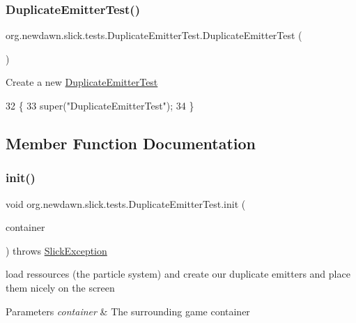 \subsubsection{\texorpdfstring{Duplicate\+Emitter\+Test()}{DuplicateEmitterTest()}}
{\footnotesize\ttfamily org.\+newdawn.\+slick.\+tests.\+Duplicate\+Emitter\+Test.\+Duplicate\+Emitter\+Test (\begin{DoxyParamCaption}{ }\end{DoxyParamCaption})\hspace{0.3cm}{\ttfamily [inline]}}

Create a new \mbox{\hyperlink{classorg_1_1newdawn_1_1slick_1_1tests_1_1_duplicate_emitter_test}{Duplicate\+Emitter\+Test}} 
\begin{DoxyCode}
32                                   \{
33         super(\textcolor{stringliteral}{"DuplicateEmitterTest"});
34     \}
\end{DoxyCode}


\subsection{Member Function Documentation}
\mbox{\label{classorg_1_1newdawn_1_1slick_1_1tests_1_1_duplicate_emitter_test_a82777b20d86f8acf92130dd142c750cd}} 
\subsubsection{\texorpdfstring{init()}{init()}}
{\footnotesize\ttfamily void org.\+newdawn.\+slick.\+tests.\+Duplicate\+Emitter\+Test.\+init (\begin{DoxyParamCaption}\item[{\mbox{\hyperlink{classorg_1_1newdawn_1_1slick_1_1_game_container}{Game\+Container}}}]{container }\end{DoxyParamCaption}) throws \mbox{\hyperlink{classorg_1_1newdawn_1_1slick_1_1_slick_exception}{Slick\+Exception}}\hspace{0.3cm}{\ttfamily [inline]}}

load ressources (the particle system) and create our duplicate emitters and place them nicely on the screen 
\begin{DoxyParams}{Parameters}
{\em container} & The surrounding game container \\
\hline
\end{DoxyParams}


